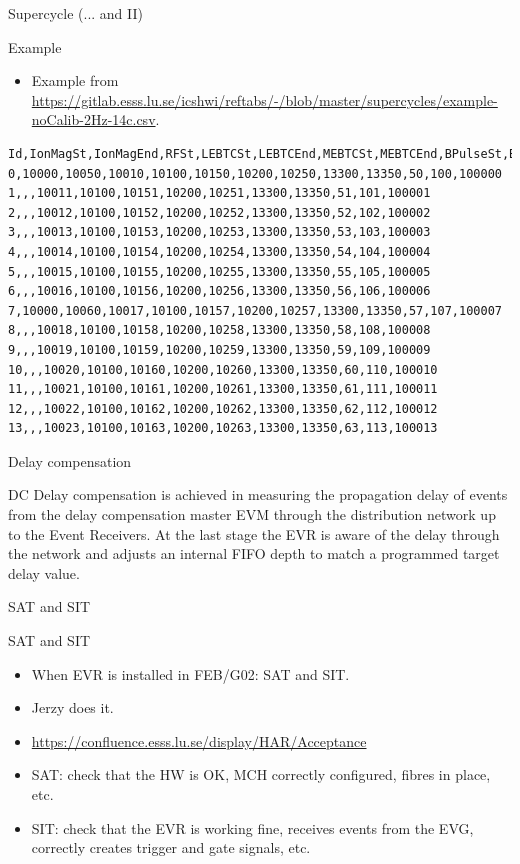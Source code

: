 \documentclass[
  9pt
  , table
  , ignorenonframetext
]{beamer}
\begin{document}
\begin{frame}[fragile]{Supercycle (... and II)}
  \begin{block}{Example}
    \begin{itemize}
      \item Example from \url{https://gitlab.esss.lu.se/icshwi/reftabs/-/blob/master/supercycles/example-noCalib-2Hz-14c.csv}.
    \end{itemize}
    \begin{lstlisting}[style=termstyle,breaklines=true,basicstyle=\scriptsize]
Id,IonMagSt,IonMagEnd,RFSt,LEBTCSt,LEBTCEnd,MEBTCSt,MEBTCEnd,BPulseSt,BPulseEnd,BLen,BEn,BCurr
0,10000,10050,10010,10100,10150,10200,10250,13300,13350,50,100,100000
1,,,10011,10100,10151,10200,10251,13300,13350,51,101,100001
2,,,10012,10100,10152,10200,10252,13300,13350,52,102,100002
3,,,10013,10100,10153,10200,10253,13300,13350,53,103,100003
4,,,10014,10100,10154,10200,10254,13300,13350,54,104,100004
5,,,10015,10100,10155,10200,10255,13300,13350,55,105,100005
6,,,10016,10100,10156,10200,10256,13300,13350,56,106,100006
7,10000,10060,10017,10100,10157,10200,10257,13300,13350,57,107,100007
8,,,10018,10100,10158,10200,10258,13300,13350,58,108,100008
9,,,10019,10100,10159,10200,10259,13300,13350,59,109,100009
10,,,10020,10100,10160,10200,10260,13300,13350,60,110,100010
11,,,10021,10100,10161,10200,10261,13300,13350,61,111,100011
12,,,10022,10100,10162,10200,10262,13300,13350,62,112,100012
13,,,10023,10100,10163,10200,10263,13300,13350,63,113,100013

    \end{lstlisting}
  \end{block}
\end{frame}

\begin{frame}{Delay compensation}
  \begin{block}{DC}
    Delay compensation is achieved in measuring the propagation delay of events from the delay compensation master EVM through the distribution network up to the Event Receivers. At the last stage the EVR is aware of the delay through the network and adjusts an internal FIFO depth to match a programmed target delay value.
  \end{block}
\end{frame}

\begin{frame}{SAT and SIT}
  \begin{block}{SAT and SIT}
    \begin{itemize}
      \item When EVR is installed in FEB/G02: SAT and SIT.
      \item Jerzy does it.
      \item \url{https://confluence.esss.lu.se/display/HAR/Acceptance}
      \item SAT: check that the HW is OK, MCH correctly configured, fibres in place, etc.
      \item SIT: check that the EVR is working fine, receives events from the EVG, correctly creates trigger and gate signals, etc.
    \end{itemize}
  \end{block}
\end{frame}
\end{document}
